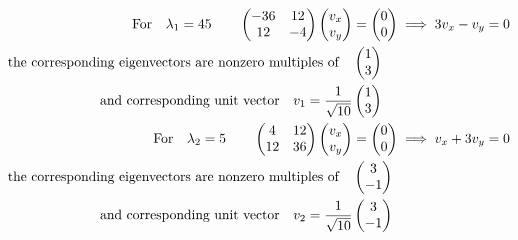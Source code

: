 \documentclass{article}
\begin{document}
\begin{align*}
    \qq*{For}\lambda_1=45\qquad\begin{pmatrix}
        -36 & 12 \\12 &-4
    \end{pmatrix}\begin{pmatrix}
        v_x \\v_y
    \end{pmatrix} & =  \begin{pmatrix}
        0 \\0
    \end{pmatrix}\implies 3v_x-v_y=0 \\
    \qq*{the corresponding eigenvectors are nonzero multiples of}                   & \begin{pmatrix}
        1 \\ 3
    \end{pmatrix}                       \\
    \qq*{and corresponding unit vector}v_1=\frac{1}{\sqrt{10}}                      & \begin{pmatrix}1\\3\end{pmatrix}                       \\
    \qq*{For}\lambda_2=5\qquad\begin{pmatrix}4 & 12 \\12 &36\end{pmatrix}\begin{pmatrix}v_x \\v_y
    \end{pmatrix}  & =  \begin{pmatrix}0 \\0
    \end{pmatrix}\implies v_x+3v_y=0 \\
    \qq*{the corresponding eigenvectors are nonzero multiples of}                   & \begin{pmatrix}
        3 \\ -1\end{pmatrix}                       \\                                                                               \qq*{and corresponding unit vector}v_2=\frac{1}{\sqrt{10}}                   & \begin{pmatrix}
        3 \\ -1
    \end{pmatrix}                       \\
    \\
\end{align*}
\end{document}
